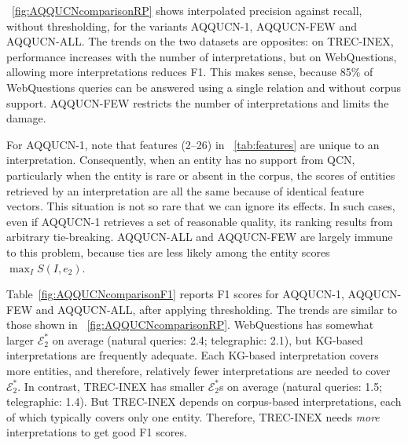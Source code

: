 \documentclass{svjour3}
\begin{document}
\figurename~\ref{fig:AQQUCNcomparisonRP} shows interpolated precision against recall, without thresholding, for the variants AQQUCN-1, AQQUCN-FEW and AQQUCN-ALL.  The trends on the two datasets are opposites: on TREC-INEX, performance increases with the number of interpretations, but on WebQuestions, allowing more interpretations reduces F1.  This makes sense, because 85\% of WebQuestions queries can be answered using a single relation \citep{Yao2015LeanQA} and without corpus support.  AQQUCN-FEW restricts the number of interpretations and limits the damage.  

For AQQUCN-1, note that features (2--26) in \tablename~\ref{tab:features} are unique to an interpretation.  Consequently, when an entity has no support from QCN, particularly when the entity is rare or absent in the corpus, the scores of entities retrieved by an interpretation are all the same because of identical feature vectors.  This situation is not so rare that we can ignore its effects.  In such cases, even if AQQUCN-1 retrieves a set of reasonable quality, its ranking results from arbitrary tie-breaking.  AQQUCN-ALL and AQQUCN-FEW are largely immune to this problem, because ties are less likely among the entity scores $\max_I S(I,e_2)$. 



Table~\ref{fig:AQQUCNcomparisonF1} reports F1 scores for AQQUCN-1, AQQUCN-FEW and AQQUCN-ALL, after applying thresholding.  The trends are similar to those shown in \figurename~\ref{fig:AQQUCNcomparisonRP}. WebQuestions has somewhat larger $\mathcal{E}^*_2$ on average (natural queries: 2.4; telegraphic: 2.1), but KG-based interpretations are frequently adequate.  Each KG-based interpretation covers more entities, and therefore, relatively fewer interpretations are needed to cover $\mathcal{E}^*_2$.  In contrast, TREC-INEX has smaller $\mathcal{E}^*_2$s on average (natural queries: 1.5; telegraphic: 1.4).  But TREC-INEX depends on corpus-based interpretations, each of which typically covers only one entity.  Therefore, TREC-INEX needs \emph{more} interpretations to get good F1 scores.
\end{document}
